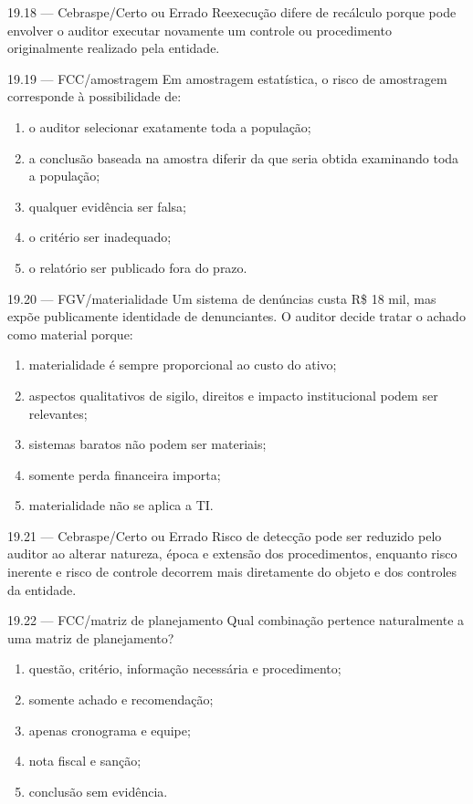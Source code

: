 \begin{questao}{ 19.18 — Cebraspe/Certo ou Errado}
Reexecução difere de recálculo porque pode envolver o auditor executar novamente um controle ou procedimento originalmente realizado pela entidade.
\end{questao}

\begin{questao}{ 19.19 — FCC/amostragem}
Em amostragem estatística, o risco de amostragem corresponde à possibilidade de:
\begin{enumerate}[label=\Alph*)]
\item o auditor selecionar exatamente toda a população;
\item a conclusão baseada na amostra diferir da que seria obtida examinando toda a população;
\item qualquer evidência ser falsa;
\item o critério ser inadequado;
\item o relatório ser publicado fora do prazo.
\end{enumerate}
\end{questao}

\begin{questao}{ 19.20 — FGV/materialidade}
Um sistema de denúncias custa R\$ 18 mil, mas expõe publicamente identidade de denunciantes. O auditor decide tratar o achado como material porque:
\begin{enumerate}[label=\Alph*)]
\item materialidade é sempre proporcional ao custo do ativo;
\item aspectos qualitativos de sigilo, direitos e impacto institucional podem ser relevantes;
\item sistemas baratos não podem ser materiais;
\item somente perda financeira importa;
\item materialidade não se aplica a TI.
\end{enumerate}
\end{questao}

\begin{questao}{ 19.21 — Cebraspe/Certo ou Errado}
Risco de detecção pode ser reduzido pelo auditor ao alterar natureza, época e extensão dos procedimentos, enquanto risco inerente e risco de controle decorrem mais diretamente do objeto e dos controles da entidade.
\end{questao}

\begin{questao}{ 19.22 — FCC/matriz de planejamento}
Qual combinação pertence naturalmente a uma matriz de planejamento?
\begin{enumerate}[label=\Alph*)]
\item questão, critério, informação necessária e procedimento;
\item somente achado e recomendação;
\item apenas cronograma e equipe;
\item nota fiscal e sanção;
\item conclusão sem evidência.
\end{enumerate}
\end{questao}

